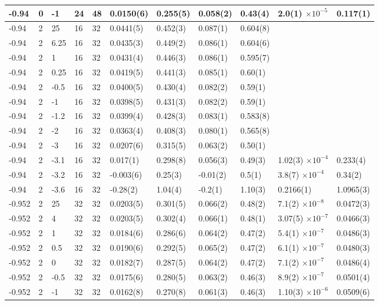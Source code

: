 \begin{table}
\begin{adjustwidth}{-4em}{-4em}
\begin{tabular}{l  l l l l l l l l l l}
-0.94 & 0 & -1 & 24 & 48 & 0.0150(6) & 0.255(5) & 0.058(2) & 0.43(4) & 2.0(1) $\times 10^{-5}$ & 0.117(1)\\
\midrule
-0.94 & 2 & 25 & 16 & 32 & 0.0441(5) & 0.452(3) & 0.087(1) & 0.604(8)\\
-0.94 & 2 & 6.25 & 16 & 32 & 0.0435(3) & 0.449(2) & 0.086(1) & 0.604(6)\\
-0.94 & 2 & 1 & 16 & 32 & 0.0431(4) & 0.446(3) & 0.086(1) & 0.595(7)\\
-0.94 & 2 & 0.25 & 16 & 32 & 0.0419(5) & 0.441(3) & 0.085(1) & 0.60(1) \\
-0.94 & 2 & -0.5 & 16 & 32 & 0.0400(5) & 0.430(4) & 0.082(2) & 0.59(1)\\
-0.94 & 2 & -1 & 16 & 32 & 0.0398(5) & 0.431(3) & 0.082(2) & 0.59(1)\\
-0.94 & 2 & -1.2 & 16 & 32 & 0.0399(4) & 0.428(3) & 0.083(1) & 0.583(8)\\
-0.94 & 2 & -2 & 16 & 32 & 0.0363(4) & 0.408(3) & 0.080(1) & 0.565(8)\\
-0.94 & 2 & -3 & 16 & 32 & 0.0207(6) & 0.315(5) & 0.063(2) & 0.50(1)\\
-0.94 & 2 & -3.1 & 16 & 32 & 0.017(1) & 0.298(8) & 0.056(3) & 0.49(3) & 1.02(3) $\times 10^{-4}$ & 0.233(4)\\
-0.94 & 2 & -3.2 & 16 & 32 & -0.003(6) & 0.25(3) & -0.01(2) & 0.5(1) & 3.8(7) $\times 10^{-4}$ & 0.34(2)\\
-0.94 & 2 & -3.6 & 16 & 32 & -0.28(2) & 1.04(4) & -0.2(1) & 1.10(3) & 0.2166(1) & 1.0965(3)\\
\midrule
-0.952 & 2 & 25 & 32 & 32 & 0.0203(5) & 0.301(5) & 0.066(2) & 0.48(2) & 7.1(2) $\times 10^{-8}$ & 0.0472(3)\\
-0.952 & 2 & 4 & 32 & 32 & 0.0203(5) & 0.302(4) & 0.066(1) & 0.48(1) & 3.07(5) $\times 10^{-7}$ & 0.0466(3)\\
-0.952 & 2 & 1 & 32 & 32 & 0.0184(6) & 0.286(6) & 0.064(2) & 0.47(2) & 5.4(1) $\times 10^{-7}$ & 0.0486(3)\\
-0.952 & 2 & 0.5 & 32 & 32 & 0.0190(6) & 0.292(5) & 0.065(2) & 0.47(2) & 6.1(1) $\times 10^{-7}$ & 0.0480(3) \\
-0.952 & 2 & 0 & 32 & 32 & 0.0182(7) & 0.287(5) & 0.064(2) & 0.47(2) &  7.1(2) $\times 10^{-7}$ & 0.0486(4)\\
-0.952 & 2 & -0.5 & 32 & 32 & 0.0175(6) & 0.280(5) & 0.063(2) & 0.46(3) & 8.9(2) $\times 10^{-7}$ & 0.0501(4)\\
-0.952 & 2 & -1 & 32 & 32 & 0.0162(8) & 0.270(8) & 0.061(3) & 0.46(3) & 1.10(3) $\times 10^{-6}$ & 0.0509(6)\\

\end{tabular}
\end{adjustwidth}
\end{table}
